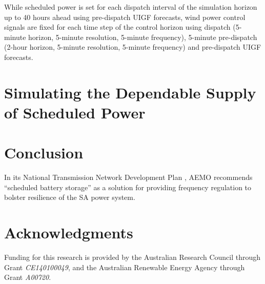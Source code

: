 \documentclass[a4paper, 10pt, twocolumn, preprint, 3p]{elsarticle}
\begin{document}
While scheduled power is set for each dispatch interval of the simulation horizon up to 40 hours ahead using pre-dispatch UIGF forecasts, wind power control signals are fixed for each time step of the control horizon using dispatch (5-minute horizon, 5-minute resolution, 5-minute frequency), 5-minute pre-dispatch (2-hour horizon, 5-minute resolution, 5-minute frequency) and pre-dispatch UIGF forecasts.


\section{Simulating the Dependable Supply of Scheduled Power}\label{sect:sim_depend_supply}


\section{Conclusion}\label{sect:conclusion}
In its National Transmission Network Development Plan \cite{NTNDP16}, AEMO recommends ``scheduled battery storage'' as a solution for providing frequency regulation to bolster resilience of the SA power system.


\section*{Acknowledgments}
Funding for this research is provided by the Australian Research Council through Grant \textit{CE140100049}, and the Australian Renewable Energy Agency through Grant \textit{A00720}.


\end{document}
